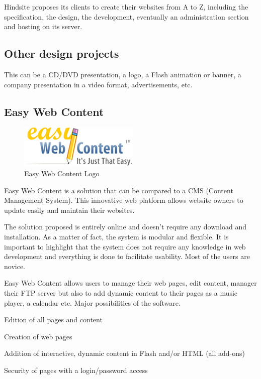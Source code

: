 Hindsite proposes its clients to create their websites from A to Z, including the
specification, the design, the development, eventually an administration
section and hosting on its server.

\subsection{Other design projects}

This can be a CD/DVD presentation, a logo, a Flash animation or banner, a
company presentation in a video format, advertisements, etc.

\subsection{Easy Web Content}
\begin{figure}[!ht]
\centering
\includegraphics[width=.30\textwidth]{img/ewc.png}
\caption{Easy Web Content Logo}
\label{figure:ewc-logo}
\end{figure}

Easy Web Content is a solution that can be compared to a CMS (Content
Management System). This innovative web platform allows website owners to
update easily and maintain their websites.

The solution proposed is entirely online and doesn’t require any download and
installation. As a matter of fact, the system is modular and flexible.
It is important to highlight that the system does not require any knowledge in web
development and everything is done to facilitate usability. Most of the users are
novice.

Easy Web Content allows users to manage their web pages, edit content, manager
their FTP server but also to add dynamic content to their pages as a music player, a calendar etc. Major possibilities of the software.

\begin{itemize*}
\item Edition of all pages and content
\item Creation of web pages
\item Addition of interactive, dynamic content in Flash and/or HTML (all add-ons)
\item Security of pages with a login/password access
\end{itemize*}

